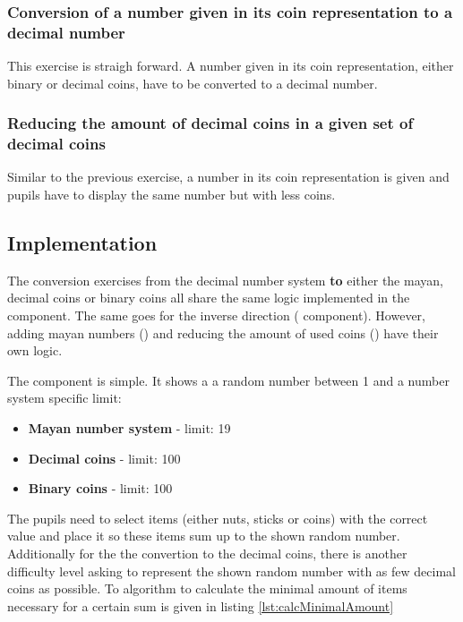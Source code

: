 \subsubsection*{Conversion of a number given in its coin representation to a decimal number}

This exercise is straigh forward. A number given in its coin representation, either binary or decimal coins, have to be converted to a decimal number. 

\subsubsection*{Reducing the amount of decimal coins in a given set of decimal coins}

Similar to the previous exercise, a number in its coin representation is given and pupils have to display the same number but with less coins.

\subsection{Implementation}

The conversion exercises from the decimal number system \textbf{to} either the mayan, decimal coins or binary coins all share the same logic implemented in the  component.
The same goes for the inverse direction ( component).
However, adding mayan numbers () and reducing the amount of used coins () have their own logic. 

The  component is simple. It shows a a random number between 1 and a number system specific limit:

\begin{itemize}
  \item \textbf{Mayan number system} - limit: 19
  \item \textbf{Decimal coins} - limit: 100
  \item \textbf{Binary coins} - limit: 100
\end{itemize}

The pupils need to select items (either nuts, sticks or coins) with the correct value and place it so these items sum up to the shown random number.
Additionally for the the convertion to the decimal coins, there is another difficulty level asking to represent the shown random number with as few decimal coins as possible. To algorithm to calculate the minimal amount of items necessary for a certain sum is given in listing \ref{lst:calcMinimalAmount} 


